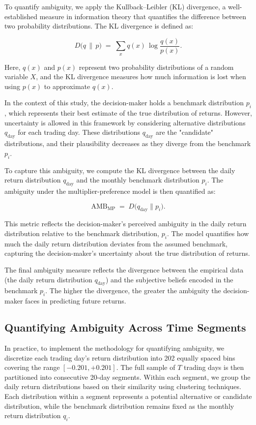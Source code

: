 \documentclass[preprint,12pt,authoryear]{elsarticle}
\begin{document}
To quantify ambiguity, we apply the Kullback--Leibler (KL) divergence, a well-established measure in information theory that quantifies the difference between two probability distributions. The KL divergence is defined as:

\[
D\bigl(q \,\|\, p\bigr) \;=\; \sum_{x} q(x)\,\log\!\frac{q(x)}{p(x)}.
\]

Here, \(q(x)\) and \(p(x)\) represent two probability distributions of a random variable \(X\), and the KL divergence measures how much information is lost when using \(p(x)\) to approximate \(q(x)\).

In the context of this study, the decision-maker holds a benchmark distribution \(p_i\), which represents their best estimate of the true distribution of returns. However, uncertainty is allowed in this framework by considering alternative distributions \(q_{\text{day}}\) for each trading day. These distributions \(q_{\text{day}}\) are the "candidate" distributions, and their plausibility decreases as they diverge from the benchmark \(p_i\).

To capture this ambiguity, we compute the KL divergence between the daily return distribution \(q_{\text{day}}\) and the monthly benchmark distribution \(p_i\). The ambiguity under the multiplier-preference model is then quantified as:

\[
\mathrm{AMB}_{\mathrm{MP}} \;=\; D\bigl(q_{\mathrm{day}} \parallel p_i\bigr).
\]

This metric reflects the decision-maker’s perceived ambiguity in the daily return distribution relative to the benchmark distribution, \(p_i\). The model quantifies how much the daily return distribution deviates from the assumed benchmark, capturing the decision-maker's uncertainty about the true distribution of returns.

The final ambiguity measure reflects the divergence between the empirical data (the daily return distribution \(q_{\text{day}}\)) and the subjective beliefs encoded in the benchmark \(p_i\). The higher the divergence, the greater the ambiguity the decision-maker faces in predicting future returns.

\subsection{Quantifying Ambiguity Across Time Segments}

In practice, to implement the methodology for quantifying ambiguity, we discretize each trading day's return distribution into 202 equally spaced bins covering the range \([-0.201, +0.201]\). The full sample of \(T\) trading days is then partitioned into consecutive 20-day segments. Within each segment, we group the daily return distributions based on their similarity using clustering techniques. Each distribution within a segment represents a potential alternative or candidate distribution, while the benchmark distribution remains fixed as the monthly return distribution \(q_i\).
\end{document}
